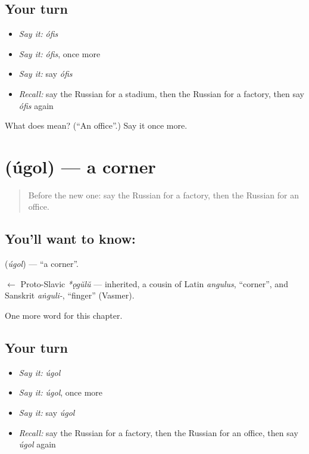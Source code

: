 \subsection*{Your turn}
\begin{itemize}
\raggedright
  \item \emph{Say it:} \emph{ófis}
  \item \emph{Say it:} \emph{ófis}, once more
  \item \emph{Say it:} say \emph{ófis}
  \item \emph{Recall:} say the Russian for a stadium, then the Russian for a factory, then say \emph{ófis} again
\end{itemize}

\begin{tcolorbox}[breakable,colback=teal!4,colframe=teal!35!black,title={Before you move on}]
What does  mean? (\textquotedblleft{}An office\textquotedblright{}.) Say it once more.
\end{tcolorbox}
\section[\texorpdfstring{\ru{угол} (úgol)}{угол (úgol)}]{ (úgol) — a corner}

\label{lesson:RU-C89-corner}



\begin{quote}
Before the new one: say the Russian for a factory, then the Russian for an office.
\end{quote}

\subsection*{You'll want to know: }
\textbf{} (\emph{úgol}) — \textquotedblleft{}a corner\textquotedblright{}.

\begin{cousinweb}
\textbf{} $\leftarrow$ Proto-Slavic \emph{*ǫgŭlŭ} — inherited, a cousin of Latin \emph{angulus}, \textquotedblleft{}corner\textquotedblright{}, and Sanskrit \emph{aṅguli-}, \textquotedblleft{}finger\textquotedblright{} (Vasmer).
\end{cousinweb}

\begin{grammarlens}[title={What you've built}]
One more word for this chapter.
\end{grammarlens}

\subsection*{Your turn}
\begin{itemize}
\raggedright
  \item \emph{Say it:} \emph{úgol}
  \item \emph{Say it:} \emph{úgol}, once more
  \item \emph{Say it:} say \emph{úgol}
  \item \emph{Recall:} say the Russian for a factory, then the Russian for an office, then say \emph{úgol} again
\end{itemize}

